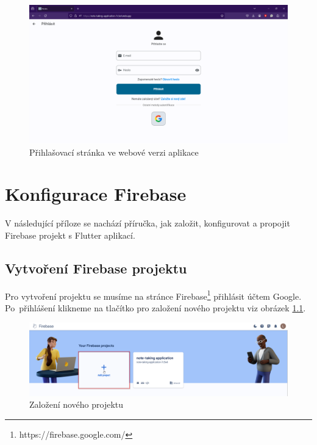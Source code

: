 \documentclass[czech, bc, kiv, he, iso690numb]{fasthesis}
\begin{document}
\begin{figure}[h!]
  \centering
  \includegraphics[width=1\textwidth]{img/BP-Runt/Website/login-web.png}
  \caption{Přihlašovací stránka ve webové verzi aplikace}
  \label{fig:website-login}
\end{figure}

\chapter{Konfigurace Firebase}\label{app:firebase-configuration}

V následující příloze se nachází příručka, jak založit, konfigurovat a propojit Firebase projekt s Flutter aplikací.

\section{Vytvoření Firebase projektu}

Pro vytvoření projektu se musíme na stránce Firebase\footnote{https://firebase.google.com/} přihlásit účtem Google. Po~přihlášení klikneme na tlačítko pro založení nového projektu viz obrázek \ref{fig:firebase-new-project}. 

\begin{figure}[h!]
  \centering
  \includegraphics[width=1\textwidth]{img/BP-Runt/firebase-configuration/new-firebase-project.png}
  \caption{Založení nového projektu}
  \label{fig:firebase-new-project}
\end{figure}
\end{document}
